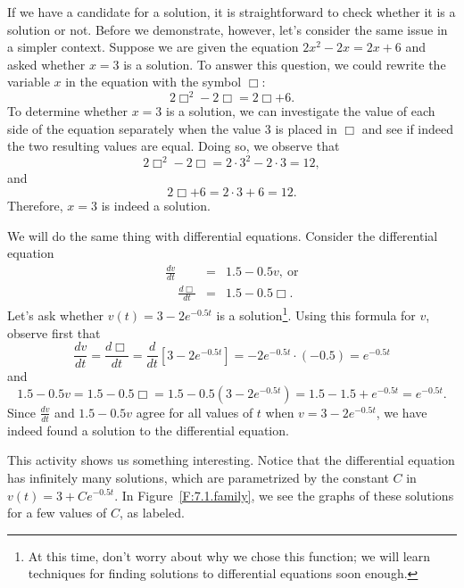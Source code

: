 If we have a candidate for a solution, it is straightforward to
check whether it is a solution or not.  Before we demonstrate,
however, let's consider the same issue in a simpler context.
Suppose we are given the equation
$2x^2 - 2x = 2x+6$ and asked whether $x=3$ is a solution.  To answer
this question, we could rewrite the variable $x$ in the equation with
the symbol $\Box$:
$$
2\Box^2 - 2\Box = 2\Box + 6.
$$
To determine whether $x=3$ is a solution, we can investigate the value of each side of the equation separately when the value $3$ is placed in $\Box$ and see if indeed the two resulting values are equal.  Doing so, we observe that
$$2\Box^2 - 2\Box = 2\cdot3^2 - 2\cdot3 = 12,$$
and
$$2\Box + 6 = 2\cdot3 + 6 = 12.$$
Therefore, $x=3$ is indeed a solution.

We will do the same thing with differential equations.  Consider
the differential equation 
\begin{eqnarray*}
\frac{dv}{dt} & = & 1.5 - 0.5v, \ \mbox{or} \\
\quad \frac{d\Box}{dt} & = & 1.5 - 0.5\Box.
\end{eqnarray*}
Let's ask whether $v(t) = 3 - 2e^{-0.5t}$ is a solution\footnote{At this time,
don't worry about why we chose this function;  we will learn
techniques for finding solutions to differential equations soon enough.  }. 
Using this formula for $v$, observe first that
$$\frac{dv}{dt} =  \frac{d\Box}{dt}  = \frac{d}{dt}[3 - 2e^{-0.5t}] = -2e^{-0.5t} \cdot (-0.5) = e^{-0.5t}$$
and
$$1.5 - 0.5v = 1.5 - 0.5\Box= 1.5 - 0.5(3 - 2e^{-0.5t}) = 1.5 - 1.5 + e^{-0.5t} = e^{-0.5t}.$$
Since $\frac{dv}{dt}$ and $1.5 - 0.5v$ agree for all values of $t$ when $v = 3-2e^{-0.5t}$, we have indeed
found a solution to the differential equation.



This activity shows us something interesting.  Notice that the
differential equation has infinitely many solutions, which are
parametrized by the constant $C$ in $v(t) = 3+Ce^{-0.5t}$.  In Figure~\ref{F:7.1.family}, we see the graphs of these solutions for a few values of $C$, 
as labeled.

